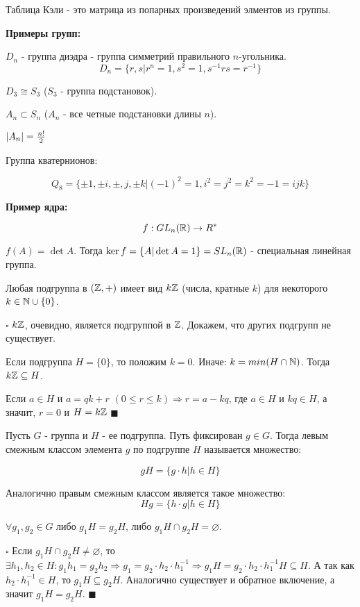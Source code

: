 \documentclass[../main.tex]{subfiles}
\begin{document}
\void
{} Таблица Кэли - это матрица из попарных произведений элментов из группы.

\void
\textbf{Примеры групп:}

 $D_n$ - группа диэдра - группа симметрий правильного $n$-угольника.
$$D_n = \{r, s\vert r^n = 1, s^2 = 1, s^{-1}rs = r^{-1}\}$$

 $D_3\cong S_3$ ($S_3$ - группа подстановок).

\void
{} $A_n\subset S_n $ ($A_n$ - все четные подстановки длины $n$).

$\vert A_n\vert = \frac{n!}{2}$

\void
{} Группа кватернионов:

$$Q_8 = \{\pm 1,\pm i,\pm, j,\pm k\vert (-1)^2 = 1, i^2 = j^2 = k^2 = -1 = ijk\}$$

\void
\textbf{Пример ядра:}

$$f: GL_n(\mathbb{R})\rightarrow R^*$$

$f(A) = \det{A}$. Тогда $\ker f = \{A\vert \det{A} = 1\} = SL_n(\mathbb{R})$ - специальная линейная группа.

\void
{} Любая подгруппа в $(\mathbb{Z}, +)$ имеет вид $k\mathbb{Z}$ (числа, кратные $k$) для некоторого $k\in \mathbb{N}\cup\{0\}$.

\void
$\square$ $k\mathbb{Z}$, очевидно, является подгруппой в $\mathbb{Z}$. Докажем, что других подгрупп не существует.

Если подгруппа $H = \{0\}$, то положим $k = 0$. Иначе: $k = min(H\cap\mathbb{N})$. Тогда $k\mathbb{Z}\subseteq H$.

Если $a\in H$ и $a = qk + r$ $(0\leq r\le k) \Rightarrow r = a - kq$, где $a\in H$ и $kq\in H$, а значит,
$r = 0$ и $H = k\mathbb{Z}$ $\blacksquare$

\void
{} Пусть $G$ - группа и $H$ - ее подгруппа. Путь фиксирован $g\in G$. Тогда левым смежным классом
элемента $g$ по подгруппе $H$ называется множество:

$$ gH = \{g\cdot h\vert h\in H\} $$

Аналогично правым смежным классом является такое множество:
$$ Hg = \{h\cdot g\vert h\in H\} $$

\void
{} $\forall g_1, g_2\in G$ либо $g_1H = g_2H$, либо $g_1H\cap g_2H = \varnothing$.

\void
$\square$ Если $g_1H\cap g_2H\neq\varnothing$, то $\exists h_1,h_2\in H: g_1h_1 = g_2h_2\Rightarrow
g_1 = g_2\cdot h_2\cdot h_1^{-1} \Rightarrow g_1H = g_2\cdot h_2\cdot h_1^{-1}H\subseteq H$.
А так как $h_2\cdot h_1^{-1}\in H$, то $g_1H\subseteq g_2H$. Аналогично существует
и обратное включение, а значит $g_1H = g_2H$. $\blacksquare$
\end{document}
